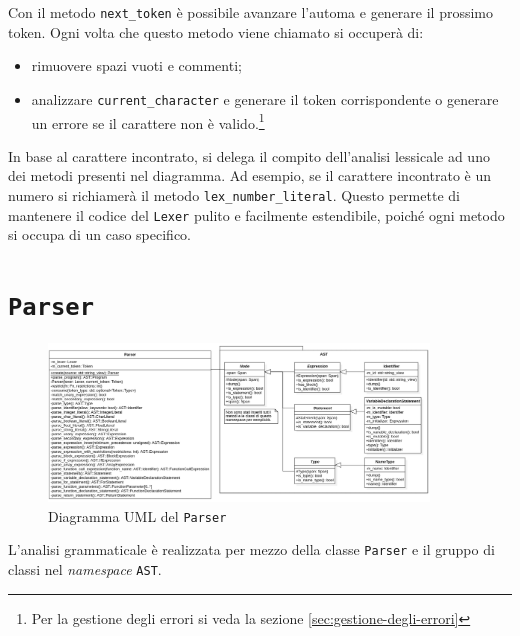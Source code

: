 Con il metodo \texttt{next\_token} \`e possibile avanzare l'automa e generare il prossimo token. Ogni volta che questo metodo viene chiamato si occuper\`a di:
\begin{itemize}
	\item rimuovere spazi vuoti e commenti;
	\item analizzare \texttt{current\_character} e generare il token corrispondente o generare un errore se il carattere non \`e valido.\footnote{Per la gestione degli errori si veda la sezione \ref{sec:gestione-degli-errori}}
\end{itemize}
In base al carattere incontrato, si delega il compito dell'analisi lessicale ad uno dei metodi presenti nel diagramma. Ad esempio, se il carattere incontrato \`e un numero si richiamer\`a il metodo \texttt{lex\_number\_literal}. Questo permette di mantenere il codice del \texttt{Lexer} pulito e facilmente estendibile, poich\'e ogni metodo si occupa di un caso specifico.

\section{\texttt{Parser}}
\label{sec:parser}

\begin{figure}[H]
	\centering
	\includegraphics[width=0.9\textwidth]{figures/parser.png}
	\caption{Diagramma UML del \texttt{Parser}}
	\label{fig:parser-uml}
\end{figure}

L'analisi grammaticale \`e realizzata per mezzo della classe \texttt{Parser} e il gruppo di classi nel \textit{namespace} \texttt{AST}.

